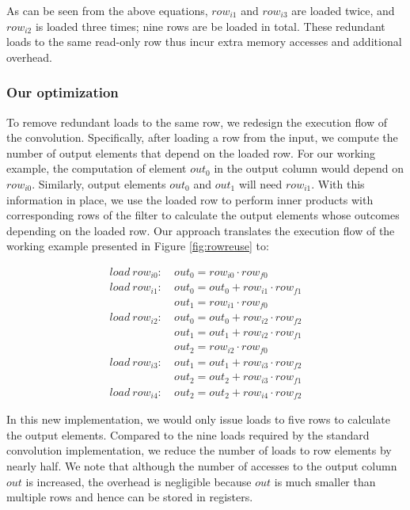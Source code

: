 As can be seen from the above equations, $row_{i1}$ and $row_{i3}$ are loaded twice, and $row_{i2}$ is loaded three times; nine rows are be
loaded in total. These redundant loads to the same read-only row thus incur extra memory accesses and additional overhead.

\subsubsection{Our optimization}
To remove redundant loads to the same row, we redesign the execution flow of the convolution.
Specifically, after loading a row from the input, we compute the number of output elements that depend on the loaded row.
For our working example, the computation of element $out_0$ in the output column would depend on $row_{i0}$.
Similarly, output elements $out_0$ and $out_1$ will need $row_{i1}$. With this information in place, we use the loaded row to perform inner products with corresponding rows of the filter to calculate the output elements whose outcomes depending on the loaded row.
Our approach translates the execution flow of the working example presented in Figure \ref {fig:rowreuse} to:

\begin{equation}\nonumber
\begin{aligned}
load\ row_{i0}:
&\ out_0=row_{i0} \cdot row_{f0} \\
load\ row_{i1}:
&\ out_0 = out_0+row_{i1} \cdot row_{f1}\\
&\ out_1=row_{i1} \cdot row_{f0}\\
load\ row_{i2}:
&\ out_0 = out_0+row_{i2} \cdot row_{f2}\\
&\ out_1 = out_1+row_{i2} \cdot row_{f1}\\
&\ out_{2}=row_{i2} \cdot row_{f0}\\
load\ row_{i3}:
&\ out_1=out_1+row_{i3} \cdot row_{f2} \\
&\ out_2=out_2+row_{i3} \cdot row_{f1}\\
load\ row_{i4}:
&\ out_2=out_2+row_{i4} \cdot row_{f2}
\end{aligned}	
\end{equation}

In this new implementation, we would only issue loads to five rows to calculate the output elements.
Compared to the nine loads required by the standard convolution implementation, we reduce the number of loads to row elements by nearly half.
We note that although the number of accesses to the output column $out$ is increased, the overhead is negligible because $out$ is much smaller than multiple rows and hence can be stored in registers.

